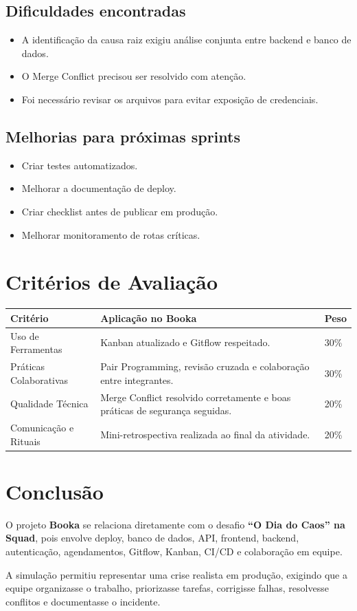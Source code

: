 \documentclass[12pt,a4paper]{article}
\begin{document}
\subsection*{Dificuldades encontradas}

\begin{itemize}
    \item A identificação da causa raiz exigiu análise conjunta entre backend e banco de dados.
    \item O Merge Conflict precisou ser resolvido com atenção.
    \item Foi necessário revisar os arquivos para evitar exposição de credenciais.
\end{itemize}

\subsection*{Melhorias para próximas sprints}

\begin{itemize}
    \item Criar testes automatizados.
    \item Melhorar a documentação de deploy.
    \item Criar checklist antes de publicar em produção.
    \item Melhorar monitoramento de rotas críticas.
\end{itemize}

\section{Critérios de Avaliação}

\begin{longtable}{|p{4cm}|p{8cm}|p{2cm}|}
\hline
\textbf{Critério} & \textbf{Aplicação no Booka} & \textbf{Peso} \\ \hline
Uso de Ferramentas & Kanban atualizado e Gitflow respeitado. & 30\% \\ \hline
Práticas Colaborativas & Pair Programming, revisão cruzada e colaboração entre integrantes. & 30\% \\ \hline
Qualidade Técnica & Merge Conflict resolvido corretamente e boas práticas de segurança seguidas. & 20\% \\ \hline
Comunicação e Rituais & Mini-retrospectiva realizada ao final da atividade. & 20\% \\ \hline
\end{longtable}

\section{Conclusão}

O projeto \textbf{Booka} se relaciona diretamente com o desafio \textbf{``O Dia do Caos'' na Squad}, pois envolve deploy, banco de dados, API, frontend, backend, autenticação, agendamentos, Gitflow, Kanban, CI/CD e colaboração em equipe.

A simulação permitiu representar uma crise realista em produção, exigindo que a equipe organizasse o trabalho, priorizasse tarefas, corrigisse falhas, resolvesse conflitos e documentasse o incidente.
\end{document}
